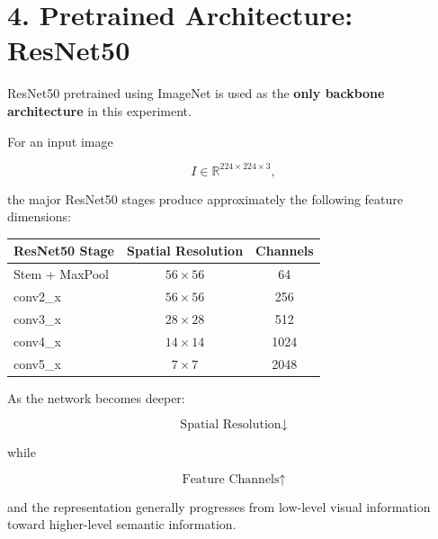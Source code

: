 \documentclass[10pt]{article}
\begin{document}
\section*{4. Pretrained Architecture: ResNet50}

ResNet50 pretrained using ImageNet is used as the
\textbf{only backbone architecture} in this experiment.

For an input image

\[
I\in\mathbb{R}^{224\times224\times3},
\]

the major ResNet50 stages produce approximately the following feature
dimensions:

\begin{center}

\begin{tabular}{|l|c|c|}
\hline
\textbf{ResNet50 Stage}
&
\textbf{Spatial Resolution}
&
\textbf{Channels}
\\
\hline

Stem + MaxPool
&
$56\times56$
&
64
\\
\hline

conv2\_x
&
$56\times56$
&
256
\\
\hline

conv3\_x
&
$28\times28$
&
512
\\
\hline

conv4\_x
&
$14\times14$
&
1024
\\
\hline

conv5\_x
&
$7\times7$
&
2048
\\
\hline

\end{tabular}

\end{center}

As the network becomes deeper:

\[
\boxed{
\text{Spatial Resolution}\downarrow
}
\]

while

\[
\boxed{
\text{Feature Channels}\uparrow
}
\]

and the representation generally progresses from low-level visual
information toward higher-level semantic information.
\end{document}
